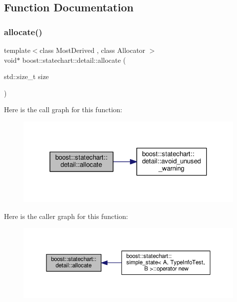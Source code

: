 \subsection{Function Documentation}
\mbox{\label{namespaceboost_1_1statechart_1_1detail_a23e46110b9423928f648c10933316959}} 
\subsubsection{\texorpdfstring{allocate()}{allocate()}}
{\footnotesize\ttfamily template$<$class Most\+Derived , class Allocator $>$ \\
void$\ast$ boost\+::statechart\+::detail\+::allocate (\begin{DoxyParamCaption}\item[{std\+::size\+\_\+t}]{size }\end{DoxyParamCaption})}

Here is the call graph for this function\+:
\nopagebreak
\begin{figure}[H]
\begin{center}
\leavevmode
\includegraphics[width=318pt]{namespaceboost_1_1statechart_1_1detail_a23e46110b9423928f648c10933316959_cgraph}
\end{center}
\end{figure}
Here is the caller graph for this function\+:
\nopagebreak
\begin{figure}[H]
\begin{center}
\leavevmode
\includegraphics[width=350pt]{namespaceboost_1_1statechart_1_1detail_a23e46110b9423928f648c10933316959_icgraph}
\end{center}
\end{figure}
\mbox{\label{namespaceboost_1_1statechart_1_1detail_a4c8f28e86a5c5c087b5a1b2e546cc93b}} 
